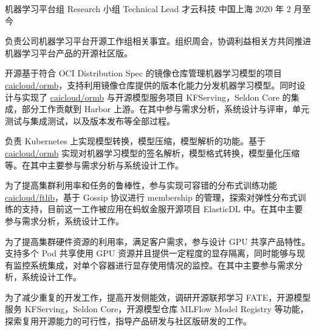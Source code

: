 

\begin{cventries}

  \cventry
    {机器学习平台组 Research 小组 Technical Lead} %
    {才云科技} %
    {中国上海} %
    {2020 年 2 月至今} %
    {
      \begin{cvitems} %
        \item 负责公司机器学习平台开源工作组相关事宜。组织周会，协调利益相关方共同推进机器学习平台产品的开源社区版。
        \item 开源基于符合 OCI Distribution Spec 的镜像仓库管理机器学习模型的项目 \href{https://github.com/caicloud/ormb}{caicloud/ormb}，支持利用镜像仓库提供的版本化能力分发机器学习模型。同时设计与实现了 \href{https://github.com/caicloud/ormb}{caicloud/ormb} 与开源模型服务项目 KFServing，Seldon Core 的集成，部分工作贡献到 Harbor 上游。在其中参与需求分析，系统设计与评审，单元测试与集成测试，以及版本发布等全部过程。
        \item 负责 Kubernetes 上实现模型转换，模型压缩，模型解析的功能。基于 \href{https://github.com/caicloud/ormb}{caicloud/ormb} 实现对机器学习模型的签名解析，模型格式转换，模型量化压缩等。在其中主要参与需求分析与系统设计工作。
        \item 为了提高集群利用率和任务的鲁棒性，参与实现可容错的分布式训练功能 \href{https://github.com/caicloud/ftlib}{caicloud/ftlib}，基于 Gossip 协议进行 membership 的管理，探索对弹性分布式训练的支持，目前这一工作被应用在蚂蚁金服开源项目 ElasticDL 中。在其中主要参与需求分析，系统设计工作。
        \item 为了提高集群硬件资源的利用率，满足客户需求，参与设计 GPU 共享产品特性。支持多个 Pod 共享使用 GPU 资源并且提供一定程度的显存隔离，同时能够与现有监控系统集成，对单个容器进行显存使用情况的监控。在其中主要参与需求分析，系统设计工作。
        \item 为了减少重复的开发工作，提高开发侧能效，调研开源联邦学习 FATE，开源模型服务 KFServing，Seldon Core，开源模型仓库 MLFlow Model Registry 等功能，探索复用开源能力的可行性，指导产品研发与社区版研发的工作。

\end{cvitems}}
\end{cventries}
